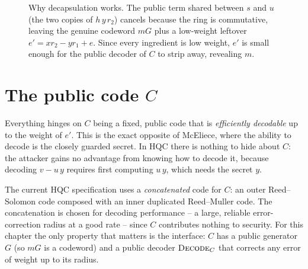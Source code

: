\begin{figure}[H]
\centering
{}
\caption{Why decapsulation works. The public term shared between $s$ and $u$ (the two copies of $h\,y\,r_2$) cancels because the ring is commutative, leaving the genuine codeword $mG$ plus a low-weight leftover $e' = x r_2 - y r_1 + e$. Since every ingredient is low weight, $e'$ is small enough for the public decoder of $C$ to strip away, revealing $m$.}
\label{fig:hqc-cancellation}
\end{figure}

\section{The public code $C$}

Everything hinges on $C$ being a fixed, public code that is \emph{efficiently decodable} up to the weight of $e'$. This is the exact opposite of McEliece, where the ability to decode is the closely guarded secret. In HQC there is nothing to hide about $C$: the attacker gains no advantage from knowing how to decode it, because decoding $v - u\,y$ requires first computing $u\,y$, which needs the secret $y$.

The current HQC specification uses a \emph{concatenated} code for $C$: an outer Reed--Solomon code composed with an inner duplicated Reed--Muller code. The concatenation is chosen for decoding performance -- a large, reliable error-correction radius at a good rate -- since $C$ contributes nothing to security. For this chapter the only property that matters is the interface: $C$ has a public generator $G$ (so $mG$ is a codeword) and a public decoder $\textsc{Decode}_C$ that corrects any error of weight up to its radius.

